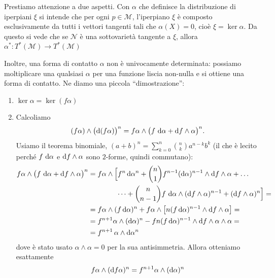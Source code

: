 Prestiamo attenzione a due aspetti. Con $\alpha$ che definisce la distribuzione di iperpiani $\xi$ si intende che per ogni $p \in \mathcal{M}$, l'iperpiano $\xi$ è composto esclusivamente da tutti i vettori tangenti tali che $\alpha (X) = 0$, cioè $\xi = \ker \alpha$.
Da questo si vede che se $\mathcal{N}$ è una sottovarietà tangente a $\xi$, allora \( \alpha^* : T^*(\mathcal{M}) \rightarrow T^*(\mathcal{M})\)

Inoltre, una forma di contatto $\alpha$ non è univocamente determinata: possiamo moltiplicare una qualsiasi $\alpha$ per una funzione liscia non-nulla e si ottiene una forma di contatto.
Ne diamo una piccola ``dimostrazione'':
\begin{enumerate}
    \item $\ker \alpha = \ker (f\alpha)$
    \item Calcoliamo
          \[
              (f\alpha) \wedge \bigl(\odif{(f\alpha)}\bigr)^n
              = f\alpha \wedge \bigl(f\,\odif{\alpha} + \odif{f}\wedge\alpha\bigr)^n .
          \]
          Usiamo il teorema binomiale, $(a+b)^n = \sum_{k=0}^n \binom{n}{k} a^{n-k}b^k$
          (il che è lecito perché $f\,\odif{\alpha}$ e $\odif{f}\wedge\alpha$ sono $2$-forme, quindi commutano):
          \begin{align*}
              f\alpha \wedge \bigl(f\,\odif{\alpha} + \odif{f}\wedge\alpha\bigr)^n
               & = f\alpha \wedge \Bigl[
                  f^n \odif{\alpha}^n
                  + \binom{n}{1} f^{n-1} (\odif{\alpha})^{n-1} \wedge \odif{f}\wedge\alpha
              + \dots                                                                                                                  \\
               & \hspace{4em} \dots
                  + \binom{n}{n-1} f\,\odif{\alpha} \wedge (\odif{f}\wedge\alpha)^{n-1}
                  + (\odif{f}\wedge\alpha)^n
              \Bigr] =                                                                                                                 \\
               & = f \alpha \wedge (f \odif{\alpha})^n + f \alpha \wedge \left[
                  n (f \odif{\alpha})^{n-1} \wedge \odif{f} \wedge \alpha
              \right] =                                                                                                                \\
               & = f^{n+1} \alpha \wedge (\odif{\alpha})^n - f n (f \odif{\alpha})^{n-1} \wedge \odif{f} \wedge \alpha \wedge \alpha = \\
               & = f^{n+1}\,  \alpha \wedge \odif{\alpha}^n
          \end{align*}
          dove è stato usato \(\alpha \wedge \alpha = 0\) per la sua antisimmetria.
          Allora otteniamo esattamente
          \begin{equation}
              f \alpha \wedge (\odif{f \alpha})^n = f^{n+1} \alpha \wedge (\odif{\alpha})^n
          \end{equation}
\end{enumerate}

